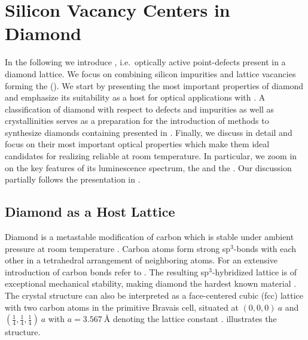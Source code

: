
\chapter{Silicon Vacancy Centers in Diamond}	\label{ch::sivs}

  In the following we introduce \ccs, i.e.\ optically active point-defects present in a diamond lattice.
  We focus on \ccs combining silicon impurities and lattice vacancies forming the \sivc (\siv).
  We start by presenting the most important properties of diamond and emphasize its suitability as a host for optical applications with \ccs.
  A classification of diamond with respect to defects and impurities as well as crystallinities serves as a preparation for the introduction of methods to synthesize diamonds containing \sivs presented in .
  Finally, we discuss \sivs in detail and focus on their most important optical properties which make them ideal candidates for realizing reliable \spss at room temperature.
  In particular, we zoom in on the key features of its luminescence spectrum, the \zpl and the \psb.
  Our discussion partially follows the presentation in \cite{Riedrich-moller2014, Neu2012, Becker2014dissertation, Steinmetz2011,Hepp2014dissertation}.

\section{Diamond as a Host Lattice}

  Diamond is a metastable modification of carbon which is stable under ambient pressure at room temperature \cite{Bundy1989}. Carbon atoms form strong sp$^3$-bonds with each other in a tetrahedral arrangement of neighboring atoms. For an extensive introduction of carbon bonds refer to . The resulting sp$^3$-hybridized lattice is of exceptional mechanical stability, making diamond the hardest known material \cite{telling2000theoretical}.
  The crystal structure can also be interpreted as a face-centered cubic (fcc) lattice with two carbon atoms in the primitive Bravais cell, situated at $(0,0,0) \ a$ and $ (\frac{1}{4}, \frac{1}{4}, \frac{1}{4}) \ a$ with $a = \SI{3.567}{\angstrom}$ denoting the lattice constant \cite{Saotome1998}.  illustrates the structure.

